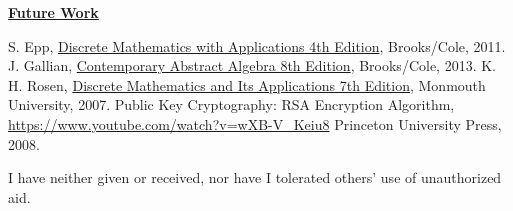 \documentclass[12pt,final]{article}
\begin{document}
\begin{center}
\underline{\textbf{Future Work}}\\
\end{center}
\pagebreak
\begin{thebibliography}{99}

 S. Epp, \underline{Discrete Mathematics with Applications 4th Edition}, Brooks/Cole, 2011.
 J. Gallian, \underline{Contemporary Abstract Algebra 8th Edition}, Brooks/Cole, 2013.
 K. H. Rosen, \underline{Discrete Mathematics and Its Applications 7th Edition}, Monmouth University, 2007.
 Public Key Cryptography: RSA Encryption Algorithm, \\ \url{https://www.youtube.com/watch?v=wXB-V_Keiu8}
Princeton University Press, 2008.

\end{thebibliography}
\begin{center}
I have neither given or received, nor have I tolerated others' use of unauthorized aid. 
\end{center}
\end{document}
